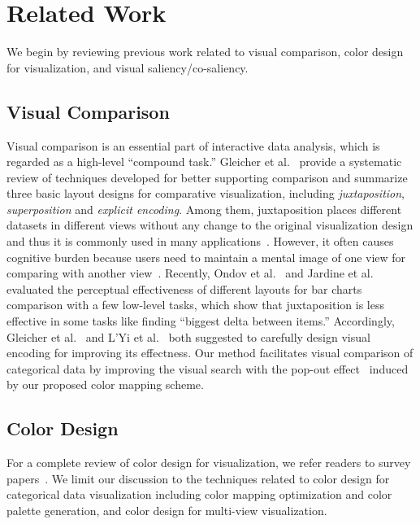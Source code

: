 \section {Related Work}
We begin by reviewing previous work related to visual comparison, color design for visualization, and
visual saliency/co-saliency.


\subsection{Visual Comparison}
Visual comparison is an essential part of interactive data analysis, which is regarded as a high-level ``compound task.'' Gleicher et al.~\cite{Gleicher11} provide a systematic review of techniques developed for better supporting comparison and summarize three basic layout designs for comparative visualization, including \emph{juxtaposition}, \emph{superposition} and \emph{explicit encoding}. Among them, juxtaposition places different datasets in different views without any change to the original visualization design and thus it is commonly used in many applications~\cite{munzner2003treejuxtaposer,Albers11,Lobo15}. However, it often causes cognitive burden because users need to maintain a mental image of one view for comparing with another view~\cite{LYi21}. Recently, Ondov et al.~\cite{Ondov19} and Jardine et al.~\cite{jardine2019perceptual} evaluated the perceptual effectiveness of different layouts for bar charts comparison with a few low-level tasks, which show that juxtaposition is less effective in some tasks like finding ``biggest delta between items.''
Accordingly, Gleicher et al.~\cite{Gleicher11} and  L'Yi et al.~\cite{LYi21} both suggested to carefully design visual encoding for improving its effectness. Our method facilitates visual comparison of categorical data by improving the visual search with the pop-out effect~\cite{enns1990three} induced by our proposed color mapping scheme.


\subsection{Color Design}
For a complete review of color design for visualization, we refer readers to survey papers~\cite{Tominski08,Zhou16}. We limit our discussion to the techniques related to color design for categorical data visualization including color mapping optimization and color palette generation, and color design for multi-view visualization.

